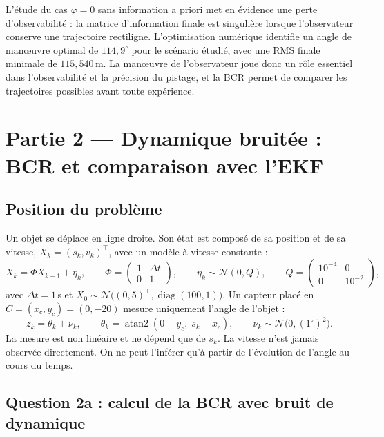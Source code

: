 \documentclass[11pt,a4paper]{article}
\newcommand{\N}{\mathcal{N}}
\DeclareMathOperator{\atantwo}{atan2}
\DeclareMathOperator{\diag}{diag}
\theoremstyle{remark}
\begin{document}
L'étude du cas $\varphi = 0$ sans information a priori met en évidence une perte d'observabilité : la matrice d'information finale est singulière lorsque l'observateur conserve une trajectoire rectiligne. L'optimisation numérique identifie un angle de manœuvre optimal de $114{,}9^\circ$ pour le scénario étudié, avec une RMS finale minimale de $115{,}540$\,m. La manœuvre de l'observateur joue donc un rôle essentiel dans l'observabilité et la précision du pistage, et la BCR permet de comparer les trajectoires possibles avant toute expérience.

\section{Partie 2 --- Dynamique bruitée : BCR et comparaison avec l'EKF}

\subsection{Position du problème}

Un objet se déplace en ligne droite. Son état est composé de sa position et de sa vitesse, $X_k = (s_k, v_k)^\top$, avec un modèle à vitesse constante :
\begin{equation}
X_k = \Phi X_{k-1} + \eta_k, \qquad
\Phi = \begin{pmatrix} 1 & \Delta t \\ 0 & 1 \end{pmatrix}, \qquad
\eta_k \sim \N(0, Q), \qquad
Q = \begin{pmatrix} 10^{-4} & 0 \\ 0 & 10^{-2} \end{pmatrix},
\label{eq:dyn}
\end{equation}
avec $\Delta t = 1$\,s et $X_0 \sim \N\big((0, 5)^\top, \diag(100, 1)\big)$.
Un capteur placé en $C = (x_c, y_c) = (0, -20)$ mesure uniquement l'angle de l'objet :
\begin{equation}
z_k = \theta_k + \nu_k, \qquad \theta_k = \atantwo(0 - y_c,\; s_k - x_c), \qquad \nu_k \sim \N\big(0, (1^\circ)^2\big).
\label{eq:mes}
\end{equation}
La mesure est non linéaire et ne dépend que de $s_k$. La vitesse n'est jamais observée directement. On ne peut l'inférer qu'à partir de l'évolution de l'angle au cours du temps.

\subsection{Question 2a : calcul de la BCR avec bruit de dynamique}
\end{document}
